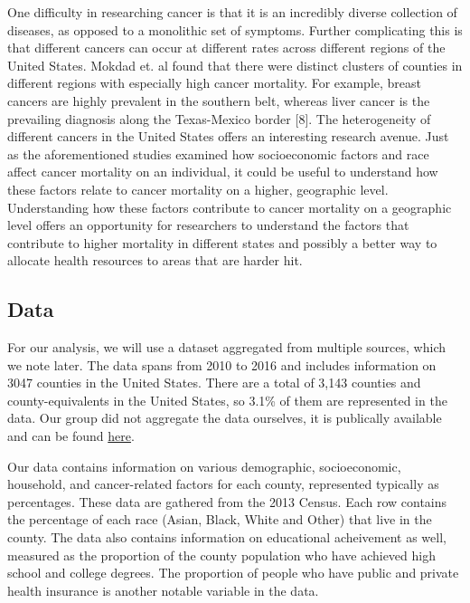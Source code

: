 \documentclass[
  11pt,
]{article}
\begin{document}
One difficulty in researching cancer is that it is an incredibly diverse
collection of diseases, as opposed to a monolithic set of symptoms.
Further complicating this is that different cancers can occur at
different rates across different regions of the United States. Mokdad
et. al found that there were distinct clusters of counties in different
regions with especially high cancer mortality. For example, breast
cancers are highly prevalent in the southern belt, whereas liver cancer
is the prevailing diagnosis along the Texas-Mexico border {[}8{]}. The
heterogeneity of different cancers in the United States offers an
interesting research avenue. Just as the aforementioned studies examined
how socioeconomic factors and race affect cancer mortality on an
individual, it could be useful to understand how these factors relate to
cancer mortality on a higher, geographic level. Understanding how these
factors contribute to cancer mortality on a geographic level offers an
opportunity for researchers to understand the factors that contribute to
higher mortality in different states and possibly a better way to
allocate health resources to areas that are harder hit.

\hypertarget{data}{%
\subsection{Data}\label{data}}

For our analysis, we will use a dataset aggregated from multiple
sources, which we note later. The data spans from 2010 to 2016 and
includes information on 3047 counties in the United States. There are a
total of 3,143 counties and county-equivalents in the United States, so
3.1\% of them are represented in the data. Our group did not aggregate
the data ourselves, it is publically available and can be found
\href{https://data.world/nrippner/ols-regression-challenge}{here}.

Our data contains information on various demographic, socioeconomic,
household, and cancer-related factors for each county, represented
typically as percentages. These data are gathered from the 2013 Census.
Each row contains the percentage of each race (Asian, Black, White and
Other) that live in the county. The data also contains information on
educational acheivement as well, measured as the proportion of the
county population who have achieved high school and college degrees. The
proportion of people who have public and private health insurance is
another notable variable in the data.
\end{document}
